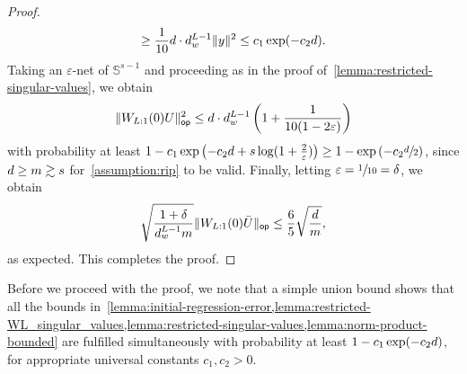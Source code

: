 \begin{proof}
\begin{equation}
{        \geq \frac{1}{10} d\cdot d_{w}^{L-1} \lVert y\rVert^2}
        \leq c_1 \exp(-c_2 d).
    \end{equation}
    Taking an $\varepsilon$-net of $\mathbb{S}^{s-1}$ and proceeding as in the proof of~\cref{lemma:restricted-singular-values}, we obtain
    \[
        \lVert W_{L:1}(0)U\rVert_{\mathsf{op}}^2 \leq d \cdot d_{w}^{L-1} \left(
        1 + \frac{1}{10(1 - 2 \varepsilon)}
        \right)
    \]
    with probability at least $1 - c_1 \exp\left(-c_2 d + s \log(1 + \frac{2}{\varepsilon})\right) \geq
    1 - \exp\left(-c_2 \sfrac{d}{2}\right)$, since
    $d \geq m \gtrsim s$ for~\cref{assumption:rip} to be valid. Finally, letting
    $\varepsilon = \sfrac{1}{10} = \delta$, we obtain
    \[
        \sqrt{\frac{1 + \delta}{d_{w}^{L - 1} m}} \lVert W_{L:1}(0) \bar{U}\rVert_{\mathsf{op}}
        \leq \frac{6}{5} \sqrt{\frac{d}{m}},
    \]
    as expected. This completes the proof.
\end{proof}



Before we proceed with the proof, we note that a simple union bound shows that
all the bounds in~\cref{lemma:initial-regression-error,lemma:restricted-WL_singular_values,lemma:restricted-singular-values,lemma:norm-product-bounded} are fulfilled simultaneously with probability at least
$1 - c_1 \exp(-c_2 d)$, for appropriate universal constants $c_1, c_2 > 0$.


